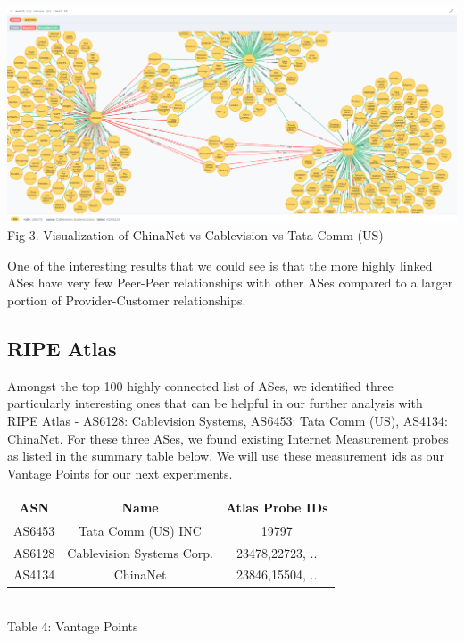 \documentclass{sig-alternate-05-2015}
\begin{document}
\begin{center}
\includegraphics[scale=0.18]{graph3}\\
Fig 3. Visualization of ChinaNet vs Cablevision vs Tata Comm (US) \\
\end{center}
One of the interesting results that we could see is that the more highly linked ASes have 
very few Peer-Peer relationships with other ASes compared to a larger portion of Provider-Customer relationships.

\subsection{RIPE Atlas}
Amongst the top 100 highly connected list of ASes, we identified three particularly interesting ones that can be helpful in our further
analysis with RIPE Atlas -
AS6128: Cablevision Systems, AS6453: Tata Comm (US), AS4134: ChinaNet. For these three ASes, we found existing Internet Measurement
probes as listed in the summary table below. We will use these measurement ids as our Vantage Points for our next experiments.
\begin{center}
\begin{tabular}{ |c|c|c| } 
\hline
ASN &  Name & Atlas Probe IDs \\
 \hline
AS6453 &  Tata Comm (US) INC & 19797 \\
 \hline
AS6128 &  Cablevision Systems Corp. & 23478,22723, .. \\
 \hline
AS4134 &  ChinaNet & 23846,15504, .. \\
 \hline
 \end{tabular}
 \\Table 4: Vantage Points\\
\end{center}
\end{document}
